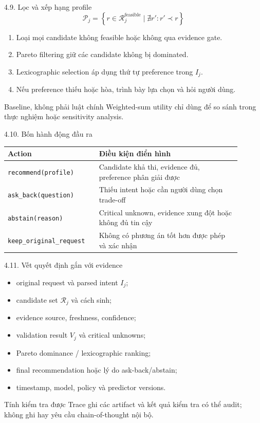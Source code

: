 \begin{frame}[t]{4.9. Lọc và xếp hạng profile}
\small
\[
\mathcal{P}_j=\left\{r\in\mathcal{R}^{\mathrm{feasible}}_j
\mid\nexists r':r'\prec r\right\}
\]
\begin{enumerate}
  \item Loại mọi candidate không feasible hoặc không qua evidence gate.
  \item Pareto filtering giữ các candidate không bị dominated.
  \item Lexicographic selection áp dụng thứ tự preference trong $I_j$.
  \item Nếu preference thiếu hoặc hòa, trình bày lựa chọn và hỏi người dùng.
\end{enumerate}
\begin{block}{Baseline, không phải luật chính}
Weighted-sum utility chỉ dùng để so sánh trong thực nghiệm hoặc sensitivity analysis.
\end{block}
\end{frame}

\begin{frame}[t]{4.10. Bốn hành động đầu ra}
\small
\begin{center}
\begin{tabular}{p{0.34\linewidth}p{0.56\linewidth}}
\toprule
\textbf{Action} & \textbf{Điều kiện điển hình} \\
\midrule
\texttt{recommend(profile)} & Candidate khả thi, evidence đủ, preference phân giải được \\
\texttt{ask\_back(question)} & Thiếu intent hoặc cần người dùng chọn trade-off \\
\texttt{abstain(reason)} & Critical unknown, evidence xung đột hoặc không đủ tin cậy \\
\texttt{keep\_original\_request} & Không có phương án tốt hơn được phép và xác nhận \\
\bottomrule
\end{tabular}
\end{center}
\end{frame}

\begin{frame}[t]{4.11. Vết quyết định gắn với evidence}
\small
\begin{itemize}
  \item original request và parsed intent $I_j$;
  \item candidate set $\mathcal{R}_j$ và cách sinh;
  \item evidence source, freshness, confidence;
  \item validation result $V_j$ và critical unknowns;
  \item Pareto dominance / lexicographic ranking;
  \item final recommendation hoặc lý do ask-back/abstain;
  \item timestamp, model, policy và predictor versions.
\end{itemize}
\begin{block}{Tính kiểm tra được}
Trace ghi các artifact và kết quả kiểm tra có thể audit; không ghi hay yêu cầu chain-of-thought nội bộ.
\end{block}
\end{frame}
